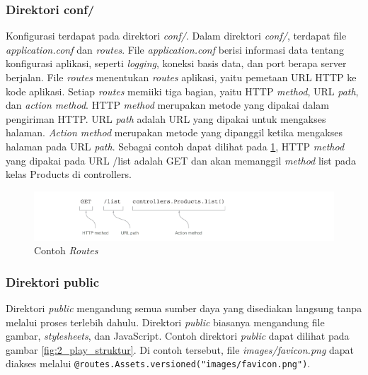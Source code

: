 \subsubsection{Direktori conf/}
Konfigurasi \play terdapat pada direktori \textit{conf/}. Dalam direktori \textit{conf/}, terdapat file \textit{application.conf} dan \textit{routes}. File \textit{application.conf} berisi informasi data tentang konfigurasi aplikasi, seperti \textit{logging}, koneksi basis data, dan port berapa server berjalan. File \textit{routes} menentukan \textit{routes} aplikasi, yaitu pemetaan URL HTTP ke kode aplikasi. Setiap \textit{routes} memiiki tiga bagian, yaitu HTTP \textit{method}, URL \textit{path}, dan \textit{action method}. HTTP \textit{method} merupakan metode yang dipakai dalam pengiriman HTTP. URL \textit{path} adalah URL yang dipakai untuk mengakses halaman. \textit{Action method} merupakan metode  yang dipanggil ketika mengakses halaman pada URL \textit{path}. Sebagai contoh dapat dilihat pada \ref{fig:2_play_routes}, HTTP \textit{method} yang dipakai pada URL /list adalah GET dan akan memanggil \textit{method} list pada kelas Products di controllers.

\begin{figure}[H]
	\centering
	\includegraphics[scale=0.7]{Gambar/play-routes}
	\caption{Contoh \textit{Routes} \cite{playforjava}} 
	\label{fig:2_play_routes}
\end{figure}

\subsubsection{Direktori public}
Direktori \textit{public} mengandung semua sumber daya yang disediakan langsung tanpa melalui proses terlebih dahulu. Direktori \textit{public} biasanya mengandung file gambar, \textit{stylesheets}, dan JavaScript. Contoh direktori \textit{public} dapat dilihat pada gambar \ref{fig:2_play_struktur}. Di contoh tersebut, file \textit{images/favicon.png} dapat diakses melalui \verb!@routes.Assets.versioned("images/favicon.png")!. 
%

